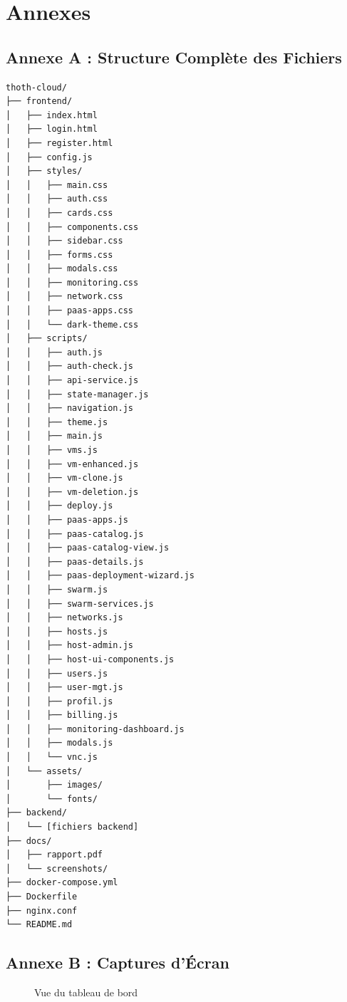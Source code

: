 \documentclass[12pt,a4paper]{article}
\begin{document}
\appendix
\section{Annexes}

\subsection{Annexe A : Structure Complète des Fichiers}

\begin{lstlisting}[language=bash,caption=Arborescence détaillée]
thoth-cloud/
├── frontend/
│   ├── index.html
│   ├── login.html
│   ├── register.html
│   ├── config.js
│   ├── styles/
│   │   ├── main.css
│   │   ├── auth.css
│   │   ├── cards.css
│   │   ├── components.css
│   │   ├── sidebar.css
│   │   ├── forms.css
│   │   ├── modals.css
│   │   ├── monitoring.css
│   │   ├── network.css
│   │   ├── paas-apps.css
│   │   └── dark-theme.css
│   ├── scripts/
│   │   ├── auth.js
│   │   ├── auth-check.js
│   │   ├── api-service.js
│   │   ├── state-manager.js
│   │   ├── navigation.js
│   │   ├── theme.js
│   │   ├── main.js
│   │   ├── vms.js
│   │   ├── vm-enhanced.js
│   │   ├── vm-clone.js
│   │   ├── vm-deletion.js
│   │   ├── deploy.js
│   │   ├── paas-apps.js
│   │   ├── paas-catalog.js
│   │   ├── paas-catalog-view.js
│   │   ├── paas-details.js
│   │   ├── paas-deployment-wizard.js
│   │   ├── swarm.js
│   │   ├── swarm-services.js
│   │   ├── networks.js
│   │   ├── hosts.js
│   │   ├── host-admin.js
│   │   ├── host-ui-components.js
│   │   ├── users.js
│   │   ├── user-mgt.js
│   │   ├── profil.js
│   │   ├── billing.js
│   │   ├── monitoring-dashboard.js
│   │   ├── modals.js
│   │   └── vnc.js
│   └── assets/
│       ├── images/
│       └── fonts/
├── backend/
│   └── [fichiers backend]
├── docs/
│   ├── rapport.pdf
│   └── screenshots/
├── docker-compose.yml
├── Dockerfile
├── nginx.conf
└── README.md
\end{lstlisting}

\subsection{Annexe B : Captures d'Écran}

\begin{figure}[H]
\centering
{}
\caption{Vue du tableau de bord}
\end{figure}
\end{document}
